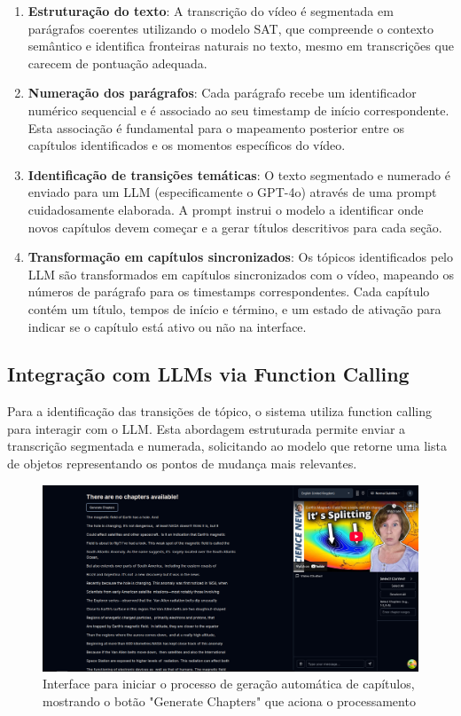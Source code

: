 \documentclass[tcc,capa]{texufpel}
\begin{document}
\begin{enumerate}
    \item \textbf{Estruturação do texto}: A transcrição do vídeo é segmentada em parágrafos coerentes utilizando o modelo SAT, que compreende o contexto semântico e identifica fronteiras naturais no texto, mesmo em transcrições que carecem de pontuação adequada.

    \item \textbf{Numeração dos parágrafos}: Cada parágrafo recebe um identificador numérico sequencial e é associado ao seu timestamp de início correspondente. Esta associação é fundamental para o mapeamento posterior entre os capítulos identificados e os momentos específicos do vídeo.

    \item \textbf{Identificação de transições temáticas}: O texto segmentado e numerado é enviado para um LLM (especificamente o GPT-4o) através de uma prompt cuidadosamente elaborada. A prompt instrui o modelo a identificar onde novos capítulos devem começar e a gerar títulos descritivos para cada seção.

    \item \textbf{Transformação em capítulos sincronizados}: Os tópicos identificados pelo LLM são transformados em capítulos sincronizados com o vídeo, mapeando os números de parágrafo para os timestamps correspondentes. Cada capítulo contém um título, tempos de início e término, e um estado de ativação para indicar se o capítulo está ativo ou não na interface.
\end{enumerate}

\subsection{Integração com LLMs via Function Calling}

Para a identificação das transições de tópico, o sistema utiliza function calling para interagir com o LLM. Esta abordagem estruturada permite enviar a transcrição segmentada e numerada, solicitando ao modelo que retorne uma lista de objetos representando os pontos de mudança mais relevantes.

\begin{figure}[H]
  \centering
  \includegraphics[width=\textwidth,height=0.45\textheight,keepaspectratio]{exemplo-slides/graphics/images/generate-chapters.png}
  \caption{Interface para iniciar o processo de geração automática de capítulos, mostrando o botão "Generate Chapters" que aciona o processamento}
  \label{fig:generate_chapters}
\end{figure}
\end{document}
